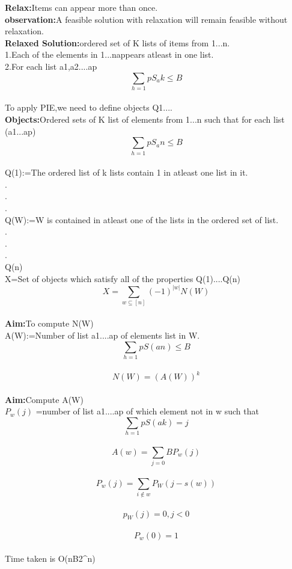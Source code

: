   \textbf{Relax:}Items can appear more than once.\\
  \textbf{observation:}A feasible solution with relaxation will remain feasible without relaxation.\\
  \textbf{Relaxed Solution:}ordered set of K lists of items from {1...n}.\\
  1.Each of the elements in {1...n}appears atleast in one list.\\
  2.For each list a1,a2....ap
$$\sum_{h=1}{p}S_ak \leq B $$\\
  To apply PIE,we need to define objects Q1....\\
  \textbf{Objects:}Ordered sets of K list of elements from {1...n} such that for each list (a1...ap) $$\sum_{h=1}{p}S_an \leq B $$\\
  Q(1):=The ordered list of k lists contain 1 in atleast one list in it.\\
  .\\
  .\\
  .\\
  Q(W):=W  is contained in atleast one of the lists in the ordered set of list.\\
  .\\
  .\\
  .\\
  Q(n)\\
  X=Set of objects which satisfy all of the properties Q(1)....Q(n)\\
$$X=\sum_{w \subseteq [n]}(-1)^{|w|} N(W) $$\\
  \textbf{Aim:}To compute N(W)\\
  A(W):=Number of list a1....ap of elements list in W.\\
$$ \sum_{h=1}{p}S(an) \leq B $$\\
$$N(W)=(A(W))^{k}  $$\\
  \textbf{Aim:}Compute A(W)\\
  $P_w(j)$ =number of list a1....ap of which element not in w such that
$$\sum_{h=1}{p}S(ak)=j  $$\\
$$A(w)=\sum_{j=0}{B}P_w(j)$$\\
$$P_w(j)=\sum_{i \notin w}P_W(j-s(w)) $$\\
$$ p_W(j)=0, j<0 $$\\
$$P_w(0)=1 $$\\
Time taken is O(nB2^{n})





